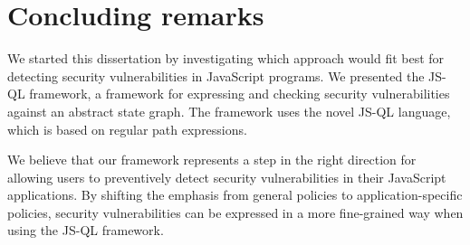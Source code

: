 \section{Concluding remarks}
We started this dissertation by investigating which approach would fit best for detecting security vulnerabilities in JavaScript programs. We presented the JS-QL framework, a framework for expressing and checking security vulnerabilities against an abstract state graph. The framework uses the novel JS-QL language, which is based on regular path expressions. 

We believe that our framework represents a step in the right direction for allowing users to preventively detect security vulnerabilities in their JavaScript applications. By shifting the emphasis from general policies to application-specific policies, security vulnerabilities can be expressed in a more fine-grained way when using the JS-QL framework. 
